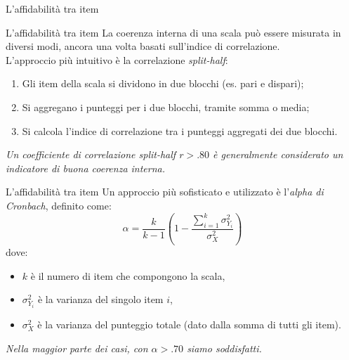 \documentclass{beamer}
\begin{document}

\begin{frame}{L'affidabilità tra item}
    \centering
\end{frame}

\begin{frame}{L'affidabilità tra item}
    La coerenza interna di una scala può essere misurata in diversi modi, ancora una volta basati sull'indice di correlazione. \\
    \vspace{1em}
    L'approccio più intuitivo è la correlazione \textit{split-half}:
    \begin{enumerate}
        \item Gli item della scala si dividono in due blocchi (es. pari e dispari);
        \item Si aggregano i punteggi per i due blocchi, tramite somma o media;
        \item Si calcola l'indice di correlazione tra i punteggi aggregati dei due blocchi.
    \end{enumerate}
    \centering
    \vspace{1em}
    \textit{Un coefficiente di correlazione split-half $r > .80$ è generalmente considerato un indicatore di buona coerenza interna.}
\end{frame}

\begin{frame}{L'affidabilità tra item}
Un approccio più sofisticato e utilizzato è l'\textit{alpha di Cronbach}, definito come:
\[
\alpha = \frac{k}{k - 1} \left(1 - \frac{\sum_{i=1}^{k} \sigma^2_{Y_i}}{\sigma^2_X}\right)
\]
dove:
\begin{itemize}
    \item \(k\) è il numero di item che compongono la scala,
    \item \(\sigma^2_{Y_i}\) è la varianza del singolo item \(i\),
    \item \(\sigma^2_X\) è la varianza del punteggio totale (dato dalla somma di tutti gli item).
\end{itemize}
\vspace{1em}
\centering
\textit{Nella maggior parte dei casi, con \(\alpha > .70\) siamo soddisfatti.}
\end{frame}
\end{document}
